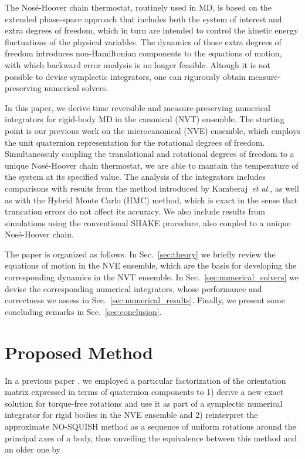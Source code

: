 \documentclass[journal=jctcce,manuscript=article,layout=twocolumn]{achemso}
\begin{document}
The Nos\'{e}-Hoover chain thermostat,\cite{Martyna_1992} routinely used in MD, is based on the extended phase-space approach that includes both the system of interest and extra degrees of freedom, which in turn are intended to control the kinetic energy fluctuations of the physical variables. The dynamics of those extra degrees of freedom introduces non-Hamiltonian components to the equations of motion, with which backward error analysis is no longer feasible. Altough it is not possible to devise symplectic integrators, one can rigurously obtain measure-preserving numerical solvers.\cite{Sergi_2001, Ezra_2004, Ezra_2006}

In this paper, we derive time reversible and measure-preserving numerical integrators for rigid-body MD in the canonical (NVT) ensemble. The starting point is our previous work on the microcanonical (NVE) ensemble,\citep{Silveira_2017} which employs the unit quaternion representation for the rotational degrees of freedom. Simultaneosuly coupling the translational and rotational degrees of freedom to a unique Nos\'{e}-Hoover chain thermostat, we are able to mantain the temperature of the system at its specified value. The analysis of the integrators includes comparisons with results from the method introduced by Kamberaj~\textit{et al.},\cite{Kamberaj_2005} as well as with the Hybrid Monte Carlo (HMC) method,\cite{Duane_1987} which is exact in the sense that truncation errors do not affect its accuracy. We also include results from simulations using the conventional SHAKE\cite{Ryckaert_1977} procedure, also coupled to a unique Nos\'{e}-Hoover chain.

The paper is organized as follows. In Sec.~\ref{sec:theory} we briefly review the equations of motion in the NVE ensemble, which are the basis for developing the corresponding dynamics in the NVT ensemble. In Sec.~\ref{sec:numerical_solvers} we devise the corresponding numerical integrators, whose performance and correctness we assess in Sec.~\ref{sec:numerical_results}. Finally, we present some concluding remarks in Sec.~\ref{sec:conclusion}.

\section{Proposed Method}
\label{sec:methodology}

In a previous paper \cite{Silveira_2017}, we employed a particular factorization of the orientation matrix expressed in terms of quaternion components to 1) derive a new exact solution for torque-free rotations and use it as part of a symplectic numerical integrator for rigid bodies in the NVE ensemble and 2) reinterpret the approximate NO-SQUISH method \cite{Miller_2002} as a sequence of uniform rotations around the principal axes of a body, thus unveiling the equivalence between this method and an older one by \citeauthor{Dullweber_1997} \cite{Dullweber_1997}
\end{document}
